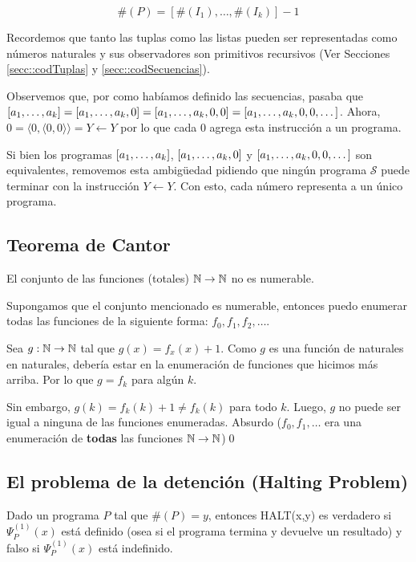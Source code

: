 $$\#(P) = [\#(I_1),\dots,\#(I_k)] - 1$$

Recordemos que tanto las tuplas como las listas pueden ser representadas como números naturales y sus observadores son primitivos recursivos (Ver Secciones \ref{secc::codTuplas} y \ref{secc::codSecuencias}).


Observemos que, por como habíamos definido las secuencias, pasaba que $[a_1,\dots, a_{k}] = [a_1,\dots, a_{k}, 0] = [a_1,\dots, a_{k},0,0] = [a_1,\dots, a_{k}, 0, 0,\dots]$. Ahora, $0 = \langle 0,\langle0,0 \rangle\rangle= Y \leftarrow Y$ por lo que cada $0$ agrega esta instrucción a un programa.

Si bien los programas $[a_1,\dots, a_{k}]$, $[a_1,\dots, a_{k}, 0]$ y $[a_1,\dots, a_{k}, 0, 0,\dots]$ son equivalentes, removemos esta ambigüedad pidiendo que ningún programa $\mathcal{S}$ puede terminar con la instrucción $Y\leftarrow Y$. Con esto, cada número representa a un único programa.

\subsection{Teorema de Cantor}
\begin{teorema}\label{teorema::cantor}
	El conjunto de las funciones (totales) $\mathbb{N}\to\mathbb{N}$ no es numerable.
\end{teorema}

\begin{demo}
	Supongamos que el conjunto mencionado es numerable, entonces puedo enumerar todas las funciones de la siguiente forma: $f_0, f_1,f_2,\dots$.
	
	Sea $g:\mathbb{N}\to\mathbb{N}$ tal que $g(x) = f_x(x) + 1$. Como $g$ es una función de naturales en naturales, debería estar en la enumeración de funciones que hicimos más arriba. Por lo que $g = f_k$ para algún $k$.
	
	Sin embargo, $g(k) = f_k(k) + 1 \neq f_k(k)$ para todo $k$. Luego, $g$ no puede 	ser igual a ninguna de las funciones enumeradas. Absurdo ($f_0,f_1,\dots$ era una enumeración de \textbf{todas} las funciones $\mathbb{N}\to\mathbb{N}$)\qed
\end{demo}

\subsection{El problema de la detención (Halting Problem)}
Dado un programa $P$ tal que $\#(P) = y$, entonces HALT(x,y) es verdadero si $\Psi_P^{(1)}(x)$ está definido (osea si el programa termina y devuelve un resultado) y falso si $\Psi_P^{(1)}(x)$ está indefinido.

